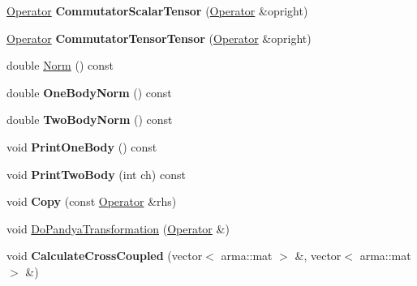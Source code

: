 \begin{DoxyCompactItemize}
\item 
\hypertarget{classOperator_a7db0372f91cffc85b293f7750c72944a}{\hyperlink{classOperator}{Operator} {\bfseries Commutator\-Scalar\-Tensor} (\hyperlink{classOperator}{Operator} \&opright)}\label{classOperator_a7db0372f91cffc85b293f7750c72944a}

\item 
\hypertarget{classOperator_aa6234e3c9b20635d32a082d74d45412b}{\hyperlink{classOperator}{Operator} {\bfseries Commutator\-Tensor\-Tensor} (\hyperlink{classOperator}{Operator} \&opright)}\label{classOperator_aa6234e3c9b20635d32a082d74d45412b}

\item 
double \hyperlink{classOperator_acb9d7959232a636191b91f6bf5b7b0c8}{Norm} () const 
\item 
\hypertarget{classOperator_a72dc7aea85c7775097d235de6f17f330}{double {\bfseries One\-Body\-Norm} () const }\label{classOperator_a72dc7aea85c7775097d235de6f17f330}

\item 
\hypertarget{classOperator_af1c40bdef64ec9abd5d95e8328565a67}{double {\bfseries Two\-Body\-Norm} () const }\label{classOperator_af1c40bdef64ec9abd5d95e8328565a67}

\item 
\hypertarget{classOperator_a5ec5a8110337108ac31d3af7337e454b}{void {\bfseries Print\-One\-Body} () const }\label{classOperator_a5ec5a8110337108ac31d3af7337e454b}

\item 
\hypertarget{classOperator_a905e42cefafaca0eb155cf41b3cd37b8}{void {\bfseries Print\-Two\-Body} (int ch) const }\label{classOperator_a905e42cefafaca0eb155cf41b3cd37b8}

\item 
\hypertarget{classOperator_a851708e76dd24603d0527f6c5c1bd544}{void {\bfseries Copy} (const \hyperlink{classOperator}{Operator} \&rhs)}\label{classOperator_a851708e76dd24603d0527f6c5c1bd544}

\item 
void \hyperlink{classOperator_a41c7174d15a89edcf9a963e686e5da92}{Do\-Pandya\-Transformation} (\hyperlink{classOperator}{Operator} \&)
\item 
\hypertarget{classOperator_aa9082f11f4b3aaf4bb08c058c4dca707}{void {\bfseries Calculate\-Cross\-Coupled} (vector$<$ arma\-::mat $>$ \&, vector$<$ arma\-::mat $>$ \&)}\label{classOperator_aa9082f11f4b3aaf4bb08c058c4dca707}


\end{DoxyCompactItemize}
